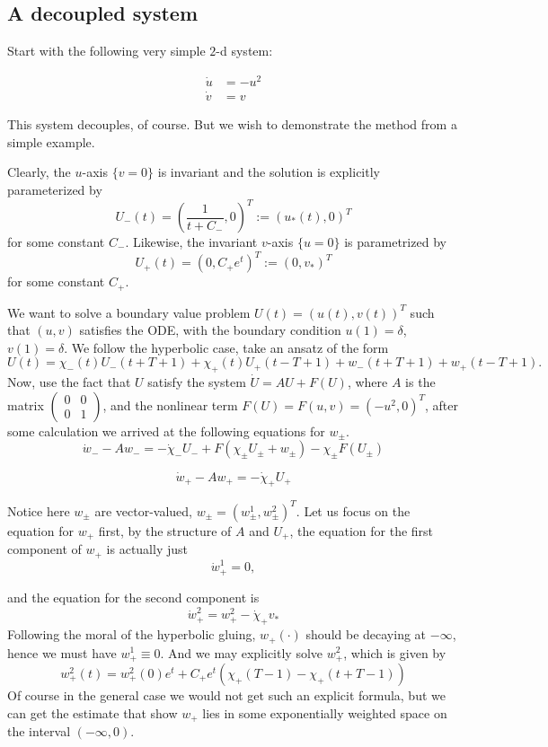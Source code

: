 \documentclass[letterpaper,11pt]{article}
\numberwithin{equation}{section}
\theoremstyle{plain}
\begin{document}
\subsection{A decoupled system}
Start with the following very simple $2$-d system:

\begin{align}\label{NH}
\dot{u} &= -u^2\\
\dot{v} &= v  \nonumber 
\end{align}

This system decouples, of course. But we wish to demonstrate the method from a simple example.

Clearly, the $u$-axis $\{v=0\}$ is invariant and the solution is explicitly parameterized by 
\[
U_-(t) = (\frac{1}{t+C_-},0)^T:=(u_*(t),0)^T
\] for some constant $C_-$. Likewise, the invariant $v$-axis $\{u=0\}$ is parametrized by 
\[
U_+(t) = (0, C_+e^t)^T:=(0,v_*)^T
\] for some constant $C_+$.

We want to solve a boundary value problem $U(t) = (u(t),v(t))^T$ such that $(u,v)$ satisfies the ODE, with the boundary condition $u(1) = \delta$, $v(1)=\delta$. We follow the hyperbolic case, take an ansatz of the form 
\[
U(t) = \chi_-(t)U_-(t+T+1) + \chi_+(t)U_+(t-T+1) + w_-(t+T+1)+w_+(t-T+1).
\]
Now, use the fact that $U$ satisfy the system $\dot{U} = AU + F(U)$, where $A$ is the matrix 
$\begin{pmatrix}
0&0\\
0&1
\end{pmatrix}$, and the nonlinear term $F(U) = F(u,v) = (-u^2,0)^T$, after some calculation we arrived at the following equations for $w_\pm$.
\begin{equation}
\dot{w}_- - Aw_- = -\dot{\chi}_- U_- + F(\chi_{\pm}U_{\pm}+w_\pm)-\chi_{\pm}F(U_\pm)
\end{equation}


\begin{equation}
\dot{w}_+ - Aw_+ = - \dot{\chi}_+ U_+
\end{equation}

Notice here $w_\pm$ are vector-valued, $w_\pm =  (w_\pm^1, w_\pm^2)^T$. Let us focus on the equation for $w_+$ first, by the structure of $A$ and $U_+$, the equation for the first component of $w_+$ is actually just
\[
\dot{w}^1_+ = 0,
\]

and the equation for the second component is
\[
\dot{w}^2_+  = w^2_+ - \dot{\chi}_+ v_*
\]
Following the moral of the hyperbolic gluing, $w_+(\cdot)$ should be decaying at $-\infty$, hence we must have $w_+^1 \equiv 0$. And we may explicitly solve $w_+^2$, which is given by
\[
w_+^2 (t) = w_+^2(0)e^{t} + C_+e^{t}\left( \chi_+(T-1)-\chi_+(t+T-1)\right)
\]
Of course in the general case we would not get such an explicit formula, but we can get the estimate that show $w_+$ lies in some exponentially weighted space on the interval $(-\infty,0)$.
\end{document}
